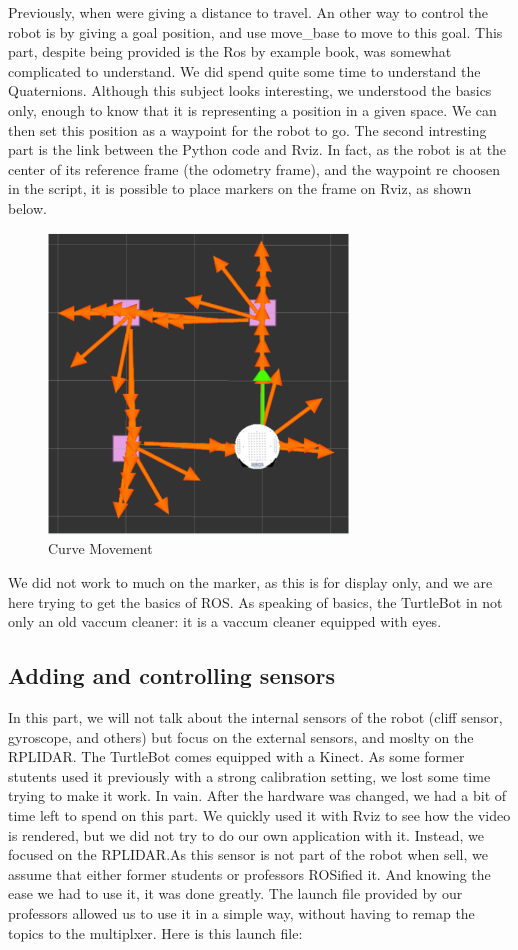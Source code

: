 \documentclass[aps,letterpaper,11pt]{revtex4}
\begin{document}
Previously, when were giving a distance to travel. An other way to control the robot is by giving a goal position, and use move\_base to move to this goal. This part, despite being provided is the Ros by example book, was somewhat complicated to understand. We did spend quite some time to understand the Quaternions. Although this subject looks interesting, we understood the basics only, enough to know that it is representing a position in a given space. We can then set this position as a waypoint for the robot to go. The second intresting part is the link between the Python code and Rviz. In fact, as the robot is at the center of its reference frame (the odometry frame), and the waypoint re choosen in the script, it is possible to place markers on the frame on Rviz, as shown below.

\begin{figure}[H]
	\centering
	\includegraphics[height=8cm]{markers.png}
	\caption{Curve Movement}
	\label{fig: Markers}    
\end{figure} 

We did not work to much on the marker, as this is for display only, and we are here trying to get the basics of ROS. As speaking of basics, the TurtleBot in not only an old vaccum cleaner: it is a vaccum cleaner equipped with eyes.

\subsection{Adding and controlling sensors}
In this part, we will not talk about the internal sensors of the robot (cliff sensor, gyroscope, and others) but focus on the external sensors, and moslty on the RPLIDAR.
The TurtleBot comes equipped with a Kinect. As some former stutents used it previously with a strong calibration setting, we lost some time trying to make it work. In vain. After the hardware was changed, we had a bit of time left to spend on this part. We quickly used it with Rviz to see how the video is rendered, but we did not try to do our own application with it.
Instead, we focused on the RPLIDAR.As this sensor is not part of the robot when sell, we assume that either former students or professors ROSified it. And knowing the ease we had to use it, it was done greatly. The launch file provided by our professors allowed us to use it in a simple way, without having to remap the topics to the multiplxer. Here is this launch file: 
\end{document}
